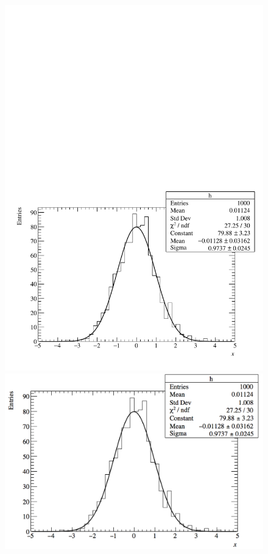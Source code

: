 \begin{figure}
  \begin{minipage}[b]{.3333\linewidth}
    \centering
    \includegraphics[width=\columnwidth]{fig/histogram.pdf}
  \end{minipage}%
  \begin{minipage}[b]{.3333\linewidth}
    \centering
    \includegraphics[width=\columnwidth]{fig/histogram_png.png}

\end{minipage}
\end{figure}
